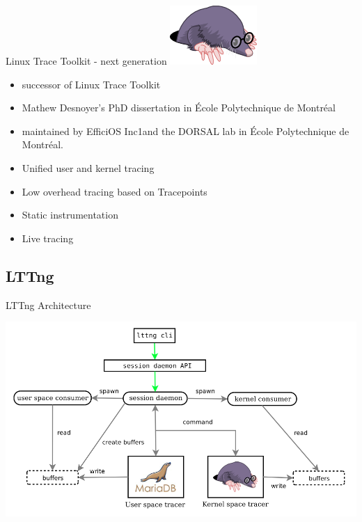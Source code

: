 \begin{frame}{Linux Trace Toolkit - next generation}
\includegraphics[scale=0.08]{images/lttng-logo.png}
\begin{itemize}
\item successor of Linux Trace Toolkit
\item Mathew Desnoyer’s PhD dissertation  in École Polytechnique de Montréal
\item maintained by EfficiOS Inc1and the DORSAL lab in École Polytechnique de
Montréal.
\item Unified user and kernel tracing
\item Low overhead tracing based on Tracepoints
\item Static instrumentation
\item Live tracing
\end{itemize}
\end{frame}

\subsection{LTTng}

\begin{frame}{LTTng Architecture}
\begin{center}
\includegraphics[scale=0.3]{images/lttng-arch.png}
\end{center}
\end{frame}

